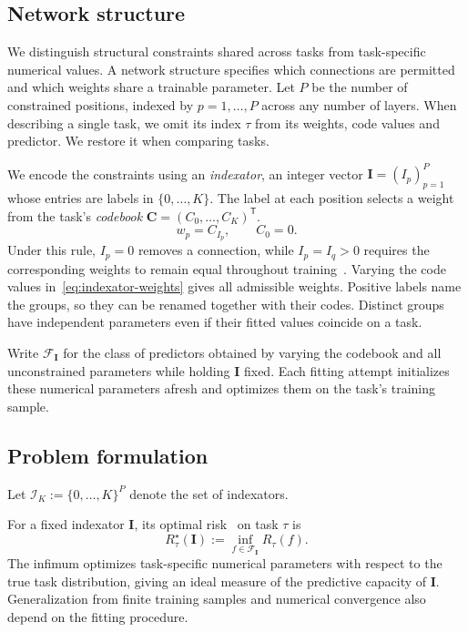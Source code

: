 \subsection{Network structure}
\label{sec:network-structure}

We distinguish structural constraints shared across tasks from
task-specific numerical values.
A network structure specifies which connections are permitted and which
weights share a trainable parameter. Let $P$ be the number of constrained
positions, indexed by $p=1,\ldots,P$ across any number of layers.
When describing a single task, we omit its index $\tau$ from its
weights, code values and predictor. We restore it when comparing tasks.

We encode the constraints using an \emph{indexator}, an integer vector
$\mathbf I=(I_p)_{p=1}^P$ whose entries are labels in $\{0,\ldots,K\}$.
The label at each position selects a weight from the task's
\emph{codebook} $\mathbf C=(C_0,\ldots,C_K)^{\mathsf T}$.
\begin{equation}
    w_p=C_{I_p},\qquad C_0=0.
    \label{eq:indexator-weights}
\end{equation}
Under this rule, $I_p=0$ removes a connection, while $I_p=I_q>0$
requires the corresponding weights to remain equal throughout
training~\cite{yeh2022equivariance}.
Varying the code values in~\eqref{eq:indexator-weights} gives all
admissible weights. Positive labels name the groups, so they can be
renamed together with their codes. Distinct groups have independent
parameters even if their fitted values coincide on a task.

Write $\mathcal F_{\mathbf I}$ for the class of predictors obtained
by varying the codebook and all unconstrained parameters while holding
$\mathbf I$ fixed. Each fitting attempt initializes these numerical
parameters afresh and optimizes them on the task's training sample.

\subsection{Problem formulation}
\label{sec:problem-formulation}

Let $\mathcal{I}_K:=\{0,\ldots,K\}^{P}$ denote the set of indexators.

For a fixed indexator $\mathbf I$, its optimal
risk~\cite[Eq.~(6)]{baxter2000model} on task $\tau$ is
\begin{equation}
    R_\tau^\star(\mathbf I):=\inf_{f\in\mathcal F_{\mathbf I}}R_\tau(f).
    \label{eq:optimal-task-risk}
\end{equation}
The infimum optimizes task-specific numerical parameters with respect
to the true task distribution, giving an ideal measure of the
predictive capacity of $\mathbf{I}$. Generalization from finite training
samples and numerical convergence also depend on the fitting procedure.


